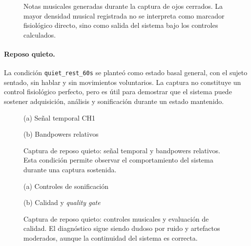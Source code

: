 \documentclass[../main.tex]{subfiles}
\begin{document}
\begin{figure}[htbp]
    \centering
    \caption{Notas musicales generadas durante la captura de ojos cerrados. La mayor densidad musical registrada no se interpreta como marcador fisiológico directo, sino como salida del sistema bajo los controles calculados.}
    \label{fig:validacion_s01_02_notes}
\end{figure}

\paragraph{Reposo quieto.}
La condición \texttt{quiet\_rest\_60s} se planteó como estado basal general, con el sujeto sentado, sin hablar y sin movimientos voluntarios. La captura no constituye un control fisiológico perfecto, pero es útil para demostrar que el sistema puede sostener adquisición, análisis y sonificación durante un estado mantenido.

\begin{figure}[htbp]
    \centering
    \begin{minipage}{0.49\textwidth}
        \centering
        \small (a) Señal temporal CH1
    \end{minipage}
    \hfill
    \begin{minipage}{0.49\textwidth}
        \centering
        \small (b) Bandpowers relativos
    \end{minipage}
    \caption{Captura de reposo quieto: señal temporal y bandpowers relativos. Esta condición permite observar el comportamiento del sistema durante una captura sostenida.}
    \label{fig:validacion_s01_03_eeg_bands}
\end{figure}

\begin{figure}[htbp]
    \centering
    \begin{minipage}{0.49\textwidth}
        \centering
        \small (a) Controles de sonificación
    \end{minipage}
    \hfill
    \begin{minipage}{0.49\textwidth}

        \centering
        \small (b) Calidad y \textit{quality gate}
    \end{minipage}
    \caption{Captura de reposo quieto: controles musicales y evaluación de calidad. El diagnóstico sigue siendo dudoso por ruido y artefactos moderados, aunque la continuidad del sistema es correcta.}
    \label{fig:validacion_s01_03_controls_quality}
\end{figure}
\end{document}
